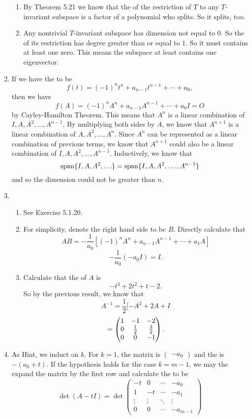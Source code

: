 \begin{enumerate}
\begin{enumerate}
\item By Theorem 5.21 we know that the \charpoly{} of the restriction of $T$ to any $T$-invariant subspace is a factor of a polynomial who splits. So it splits, too.
\item Any nontrivial $T$-invariant subspace has dimension not equal to $0$. So the \charpoly{} of its restriction has degree greater than or equal to $1$. So it must contains at least one zero. This means the subspace at least contains one eigenvector.
\end{enumerate}
\item If we have the \charpoly{} to be  
\[f(t)=(-1)^nt^n+a_{n-1}t^{n-1}+\cdots +a_0,\]
then we have 
\[f(A)=(-1)^nA^n+a_{n-1}A^{n-1}+\cdots +a_0I=O\]
by Cayley-Hamilton Theorem. This means that $A^n$ is a linear combination of $I,A,A^2,\ldots ,A^{n-1}$. By multiplying both sides by $A$, we know that $A^{n+1}$ is a linear combination of $A,A^2,\ldots ,A^{n}$. Since $A^n$ can be represented as a linear combination of previous terms, we know that $A^{n+1}$ could also be a linear combination of $I,A,A^2,\ldots ,A^{n-1}$. Inductively, we know that 
\[\sp\{I,A,A^2,\ldots \}=\sp\{I,A,A^2,\ldots ,A^{n-1}\}\]
and so the dimension could not be greater than $n$.
\item \begin{enumerate}
\item See Exercise 5.1.20.
\item For simplicity, denote the right hand side to be $B$. Directly calculate that 
\[AB=-\frac{1}{a_0}[(-1)^nA^n+a_{n-1}A^{n-1}+\cdots +a_1A]\]
\[-\frac{1}{a_0}(-a_0I)=I.\]
\item Calculate that the \charpoly{} of $A$ is 
$$-{t}^{3}+2{t}^{2}+t-2.$$
So by the previous result, we know that 
\[A^{-1}=\frac{1}{2}[-{A}^{2}+2{A}+I\]
\[=\begin{pmatrix}1 & -1 & -2\cr 0 & \frac{1}{2} & \frac{3}{2}\cr 0 & 0 & -1\end{pmatrix}.\]
\end{enumerate}
\item As Hint, we induct on $k$. For $k=1$, the matrix is $\begin{pmatrix}-a_0\end{pmatrix}$ and the \charpoly{} is $-(a_0+t)$. If the hypothesis holds for the case $k=m-1$, we may the expand the matrix by the first row and calculate the \charpoly{} to be 
\[\det(A-tI)=\det\begin{pmatrix}-t&0&\cdots &-a_0\\1&-t&\cdots&-a_1\\\vdots &\vdots&\ddots &\vdots \\0&0&\cdots &-a_{m-1}\end{pmatrix}\]

\end{enumerate}
